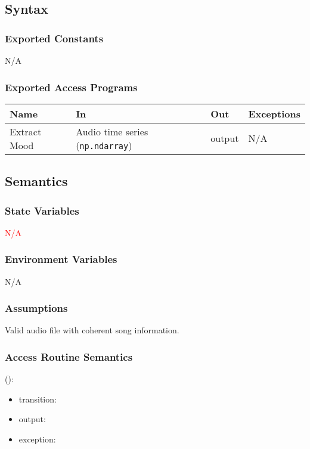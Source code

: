 \documentclass[12pt, titlepage]{article}
\begin{document}
\subsection{Syntax}

\subsubsection{Exported Constants}
N/A

\subsubsection{Exported Access Programs}

\begin{center}
\begin{tabular}{p{2cm} p{4cm} p{4cm} p{2cm}}
\hline
\textbf{Name} & \textbf{In} & \textbf{Out} & \textbf{Exceptions}\\
\hline%
Extract Mood &Audio time series (\texttt{np.ndarray}) &output &N/A\\
\hline
\end{tabular}
\end{center}

\subsection{Semantics}

\subsubsection{State Variables}
\textcolor{red}{N/A}

\subsubsection{Environment Variables}
N/A

\subsubsection{Assumptions}
Valid audio file with coherent song information.

\subsubsection{Access Routine Semantics}

\noindent {}():
\begin{itemize}
\item transition:  
\item output:  
\item exception:  
\end{itemize}
\end{document}
